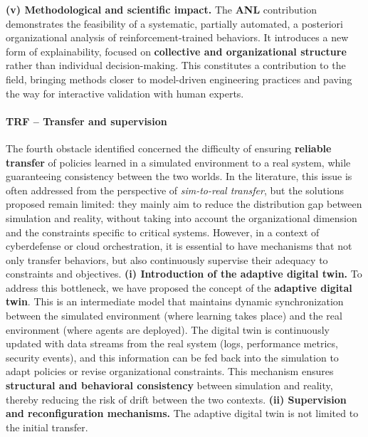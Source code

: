         \medskip
        \noindent
        \textbf{(v) Methodological and scientific impact.}
        The \textbf{ANL} contribution demonstrates the feasibility of a systematic, partially automated, a posteriori organizational analysis of reinforcement-trained  behaviors.
        It introduces a new form of explainability, focused on \textbf{collective and organizational structure} rather than individual decision-making.
        This constitutes a contribution to the field, bringing  methods closer to model-driven engineering practices and paving the way for interactive validation with human experts.
        \paragraph{TRF – Transfer and supervision}
        The fourth obstacle identified concerned the difficulty of ensuring \textbf{reliable transfer} of policies learned in a simulated environment to a real system, while guaranteeing consistency between the two worlds.
        In the  literature, this issue is often addressed from the perspective of \textit{sim-to-real transfer}, but the solutions proposed remain limited:
        they mainly aim to reduce the distribution gap between simulation and reality, without taking into account the organizational dimension and the constraints specific to critical systems.
        However, in a context of cyberdefense or cloud orchestration, it is essential to have mechanisms that not only transfer behaviors, but also continuously supervise their adequacy to constraints and objectives.
        \medskip
        \noindent
        \textbf{(i) Introduction of the adaptive digital twin.}
        To address this bottleneck, we have proposed the concept of the \textbf{adaptive digital twin}.
        This is an intermediate model that maintains dynamic synchronization between the simulated environment (where learning takes place) and the real environment (where agents are deployed).
        The digital twin is continuously updated with data streams from the real system (logs, performance metrics, security events), and this information can be fed back into the simulation to adapt policies or revise organizational constraints.
        This mechanism ensures \textbf{structural and behavioral consistency} between simulation and reality, thereby reducing the risk of drift between the two contexts.
        \medskip
        \noindent
        \textbf{(ii) Supervision and reconfiguration mechanisms.}
        The adaptive digital twin is not limited to the initial transfer.
